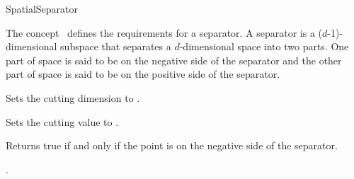 

\begin{ccRefConcept}{SpatialSeparator}

\begin{ccAdvanced}


\ccDefinition
  
The concept \ccRefName\ defines the requirements for a separator.
A separator is a ($d$-1)-dimensional subspace that separates a $d$-dimensional space into two parts.
One part of space is said to be on the negative side of the separator and the other part of space is 
said to be on the positive side of the separator.

\ccTypes


\ccCreation
{}  %


\ccOperations

{Sets the cutting dimension to . }

{Sets the cutting value to . }





{Returns true if and only if the point  is on the negative side of the separator.}


\ccHasModels

.



\end{ccAdvanced}

\end{ccRefConcept}


